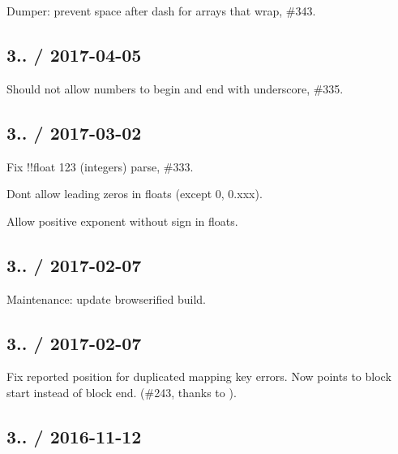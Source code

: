 
\begin{DoxyItemize}
\item Dumper\+: prevent space after dash for arrays that wrap, \#343.
\end{DoxyItemize}

\subsection*{3.. / 2017-\/04-\/05 }


\begin{DoxyItemize}
\item Should not allow numbers to begin and end with underscore, \#335.
\end{DoxyItemize}

\subsection*{3.. / 2017-\/03-\/02 }


\begin{DoxyItemize}
\item Fix {\ttfamily !!float 123} (integers) parse, \#333.
\item Don\textquotesingle{}t allow leading zeros in floats (except 0, 0.\+xxx).
\item Allow positive exponent without sign in floats.
\end{DoxyItemize}

\subsection*{3.. / 2017-\/02-\/07 }


\begin{DoxyItemize}
\item Maintenance\+: update browserified build.
\end{DoxyItemize}

\subsection*{3.. / 2017-\/02-\/07 }


\begin{DoxyItemize}
\item Fix reported position for {\ttfamily duplicated mapping key} errors. Now points to block start instead of block end. (\#243, thanks to ).
\end{DoxyItemize}

\subsection*{3.. / 2016-\/11-\/12 }


